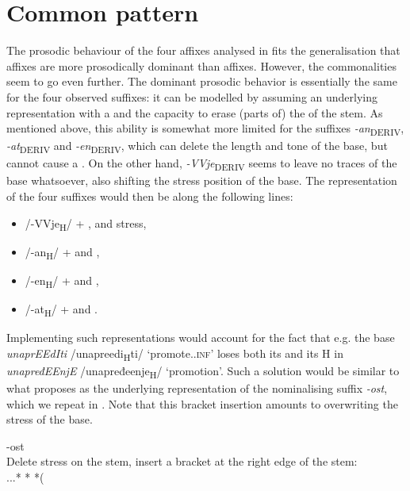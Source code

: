 \documentclass[output=paper, colorlinks, citecolor=brown, newtxmath]{langsci/langscibook}
\begin{document}
\section{Common pattern}\label{sec:simonovic:5}

The prosodic behaviour of the four affixes analysed in  fits the generalisation that  affixes are more prosodically dominant than  affixes. However, the commonalities seem to go even further. The dominant prosodic behavior is essentially the same for the four observed suffixes: it can be modelled by assuming an underlying representation with a  and the capacity to erase (parts of) the  of the stem. As mentioned above, this ability is somewhat more limited for the  suffixes \textit{-an}\textsubscript{DERIV}, \textit{-at}\textsubscript{DERIV} and \textit{-en}\textsubscript{DERIV}, which can delete the length and tone of the base, but cannot cause a . On the other hand, \textit{-VVje}\textsubscript{DERIV}  seems to leave no traces of the base  whatsoever, also shifting the stress position of the base. The representation of the four suffixes would then be along the following lines: \begin{itemize}
\item /-VVje\textsubscript{H}/ + ,  and stress,
\item /-an\textsubscript{H}/ +  and ,
\item /-en\textsubscript{H}/ +  and ,
\item /-at\textsubscript{H}/ +  and .
\end{itemize}

Implementing such representations would account for the fact that e.g. the base \textit{unaprEEdIti }/unapreedi\textsubscript{H}ti/ `promote.\textsc{.inf}' loses both its  and its H in \textit{unapređEEnjE} /unapređeenje\textsubscript{H}/ `promotion'. Such a solution would be similar to what \citet{Mar2002} proposes as the underlying representation of the  nominalising suffix \textit{-ost}, which we repeat in . Note that this bracket insertion amounts to overwriting the stress of the base.

\ea \label{ex:simonovic:5} \gll -ost \\ Delete stress on the stem, insert a bracket at the right edge of the stem: \\...* * *(
		\\
\z
\end{document}
